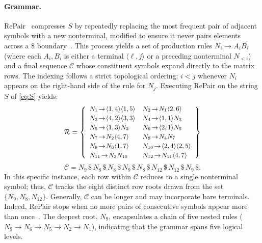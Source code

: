 \documentclass[twoside,leqno,twocolumn]{article}
\begin{document}
\paragraph{Grammar.} 

RePair~\cite{repair} compresses $S$ by repeatedly replacing the most frequent pair of adjacent symbols with a new nonterminal, modified to ensure it never pairs elements across a \$ boundary~\cite{mmrepair}. This process yields a set of production rules $N_i\to A_iB_i$ (where each $A_i,B_i$ is either a terminal $\langle\ell,j\rangle$ or a preceding nonterminal $N_{<i}$) and a final sequence $\mathcal{C}$ whose constituent symbols expand directly to the matrix rows. The indexing follows a strict topological ordering: $i<j$ whenever $N_i$ appears on the right-hand side of the rule for $N_j$. Executing RePair on the string $S$ of \cref{eq:S} yields:
\begin{equation}
\label{eq:rules}
\small
\mathcal{R}=\left\{
\begin{array}{ll}
N_1\!\to\!\langle1,4\rangle\langle1,5\rangle &
N_2\!\to\!N_1\langle2,6\rangle \\[2pt]
N_3\!\to\!\langle4,2\rangle\langle3,3\rangle &
N_4\!\to\!\langle1,1\rangle N_3\\[2pt]
N_5\!\to\!\langle1,3\rangle N_2 &
N_6\!\to\!\langle2,1\rangle N_5 \\[2pt]
N_7\!\to\!N_2\langle4,7\rangle &
N_8\!\to\!N_4 N_7\\[2pt]
N_9\!\to\!N_6\langle1,7\rangle &
N_{10}\!\to\!\langle2,4\rangle\langle2,5\rangle \\[2pt]
N_{11}\!\to\!N_3 N_{10} &
N_{12}\!\to\!N_{11}\langle4,7\rangle
\end{array}\right\}
\end{equation}
\begin{equation}
\label{eq:C}
\mathcal{C}=N_9\,\$\,N_8\,\$\,N_8\,\$\,N_9\,\$\,N_8\,\$\,N_{12}\,\$\,N_{12}\,\$\,N_9\,\$ .
\end{equation}
In this specific instance, each row within $\mathcal{C}$ reduces to a single nonterminal symbol; thus, $\mathcal{C}$ tracks the eight distinct row roots drawn from the set $\{N_9,N_8,N_{12}\}$. Generally, $\mathcal{C}$ can be longer and may incorporate bare terminals. Indeed, RePair stops when no more pairs of consecutive symbols appear more than once~\cite{mmrepair}. The deepest root, $N_9$, encapsulates a chain of five nested rules ($N_9\!\to\!N_6\!\to\!N_5\!\to\!N_2\!\to\!N_1$), indicating that the grammar spans five logical levels.
\end{document}
